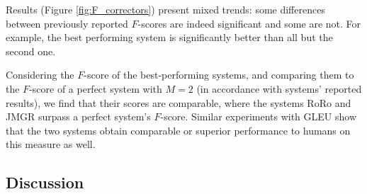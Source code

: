 \documentclass[11pt, a4paper]{article}
\begin{document}
Results (Figure \ref{fig:F_correctors}) present mixed trends: some
differences between previously reported $F$-scores are indeed significant and some are not.
For example, the best performing system is significantly better than all but the second one.

Considering the $F$-score of the best-performing systems, and comparing 
them to the $F$-score of a perfect system with $M=2$ (in accordance with systems' reported results),
we find that their scores are comparable, where the systems RoRo and JMGR surpass a perfect system's $F$-score.
Similar experiments with GLEU show that the two systems obtain comparable or superior performance to humans
on this measure as well.

%

\subsection{Discussion}\label{subsec:mult_discussion}
	
%
\end{document}

